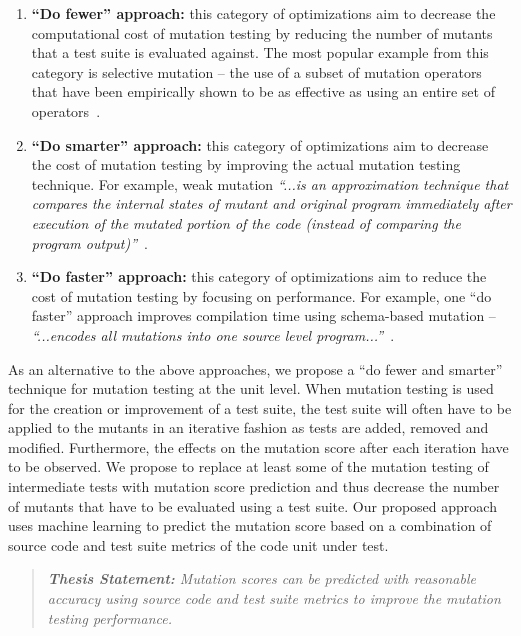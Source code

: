 \begin{enumerate}
  \item \textbf{``Do fewer'' approach:} this category of optimizations aim to decrease the computational cost of mutation testing by reducing the number of mutants that a test suite is evaluated against. The most popular example from this category is selective mutation -- the use of a subset of mutation operators that have been empirically shown to be as effective as using an entire set of operators~\cite{OLR+96}.

  \item \textbf{``Do smarter'' approach:} this category of optimizations aim to decrease the cost of mutation testing by improving the actual mutation testing technique. For example, weak mutation \emph{``...is an approximation technique that compares the internal states of mutant and original program immediately after execution of the mutated portion of the code (instead of comparing the program output)''}~\cite{OU00}.

  \item \textbf{``Do faster'' approach:} this category of optimizations aim to reduce the cost of mutation testing by focusing on performance. For example, one ``do faster'' approach improves compilation time using schema-based mutation -- \emph{``...encodes all mutations into one source level program...''}~\cite{OU00}.
\end{enumerate}

As an alternative to the above approaches, we propose a ``do fewer and smarter'' technique for mutation testing at the unit level.  When mutation testing is used for the creation or improvement of a test suite,  the test suite will often have to be applied to the mutants in an iterative fashion as tests are added, removed and modified. Furthermore, the effects on the mutation score after each iteration have to be observed. We propose to replace at least some of the mutation testing of intermediate tests with mutation score prediction and thus decrease the number of mutants that have to be evaluated using a test suite. Our proposed approach uses machine learning to predict the mutation score based on a combination of source code and test suite metrics of the code unit under test.

\begin{quote}
  \emph{\textbf{Thesis Statement:} Mutation scores can be predicted with reasonable accuracy using source code and test suite metrics to improve the mutation testing performance.}
\end{quote}

